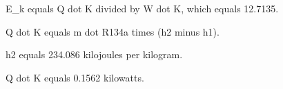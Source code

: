 E_k equals Q dot K divided by W dot K, which equals 12.7135.  

Q dot K equals m dot R134a times (h2 minus h1).  

h2 equals 234.086 kilojoules per kilogram.  

Q dot K equals 0.1562 kilowatts.
